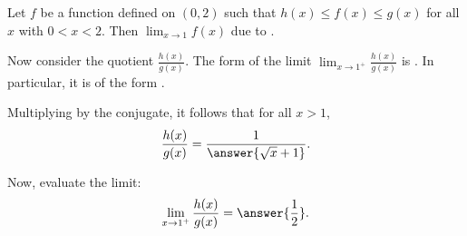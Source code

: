 \documentclass{ximera}
\begin{document}
\begin{exercise}
\begin{multipleChoice}
{
}
\end{multipleChoice} 
\begin{exercise}
Let $f$ be a function defined on $(0,2)$ such that $h(x)\le f(x)\le g(x)$ for all $x$ with $0<x<2$. Then $\lim_{x\to 1}f(x)$  due to .
\begin{exercise}
Now consider the quotient $\frac{h(x)}{g(x)}$. The form of the limit $\lim_{x\to 1^+}\frac{h(x)}{g(x)}$ is . In particular, it is of the form .
\begin{exercise}
Multiplying by the conjugate, it follows that for all $x>1$,  
\[
\frac{h(x)}{g(x)}=\frac{1}{\answer{\sqrt{x}+1}}.
\]
\begin{exercise}
Now, evaluate the limit:
\[
\lim_{x\to 1^+}\frac{h(x)}{g(x)}=\answer{\frac{1}{2}}.
\]
\end{exercise}
\end{exercise}
\end{exercise}
\end{exercise}
\end{exercise}
\end{document}
